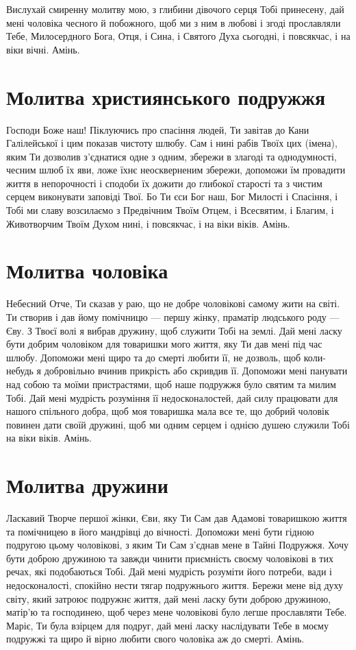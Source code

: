 \documentclass[chapters.tex]{subfiles}
\begin{document}
Вислухай смиренну молитву мою, з глибини дівочого серця Тобі принесену, дай мені чоловіка чесного й побожного, щоб ми з ним в любові і згоді прославляли Тебе, Милосердного Бога, Отця, і Сина, і Святого Духа сьогодні, і повсякчас, і на віки вічні. Амінь.

\section{Молитва християнського подружжя}
Господи Боже наш! Піклуючись про спасіння людей, Ти завітав до Кани Галілейської і цим показав чистоту шлюбу. Сам і нині рабів Твоїх цих (імена), яким Ти дозволив з’єднатися одне з одним, збережи в злагоді та однодумності, чесним шлюб їх яви, ложе їхнє неоскверненим збережи, допоможи їм провадити життя в непорочності і сподоби їх дожити до глибокої старості та з чистим серцем виконувати заповіді Твої. Бо Ти єси Бог наш, Бог Милості і Спасіння, і Тобі ми славу возсилаємо з Предвічним Твоїм Отцем, і Всесвятим, і Благим, і Животворчим Твоїм Духом нині, і повсякчас, і на віки віків. Амінь.

\section{Молитва чоловіка}
Небесний Отче, Ти сказав у раю, що не добре чоловікові самому жити на світі. Ти створив і дав йому помічницю — першу жінку, праматір людського роду — Єву. З Твоєї волі я вибрав дружину, щоб служити Тобі на землі. Дай мені ласку бути добрим чоловіком для товаришки мого життя, яку Ти дав мені під час шлюбу. Допоможи мені щиро та до смерті любити її, не дозволь, щоб коли-небудь я добровільно вчинив прикрість або скривдив її. Допоможи мені панувати над собою та моїми пристрастями, щоб наше подружжя було святим та милим Тобі. Дай мені мудрість розуміння її недосконалостей, дай силу працювати для нашого спільного добра, щоб моя товаришка мала все те, що добрий чоловік повинен дати своїй дружині, щоб ми одним серцем і однією душею служили Тобі на віки віків. Амінь.

\section{Молитва дружини}
Ласкавий Творче першої жінки, Єви, яку Ти Сам дав Адамові товаришкою життя та помічницею в його мандрівці до вічності. Допоможи мені бути гідною подругою цьому чоловікові, з яким Ти Сам з’єднав мене в Тайні Подружжя. Хочу бути доброю дружиною та завжди чинити приємність своєму чоловікові в тих речах, які подобаються Тобі. Дай мені мудрість розуміти його потреби, вади і недосконалості, спокійно нести тягар подружнього життя. Бережи мене від духу світу, який затроює подружнє життя, дай мені ласку бути доброю дружиною, матір’ю та господинею, щоб через мене чоловікові було легше прославляти Тебе. Маріє, Ти була взірцем для подруг, дай мені ласку наслідувати Тебе в моєму подружжі та щиро й вірно любити свого чоловіка аж до смерті. Амінь.
\end{document}
